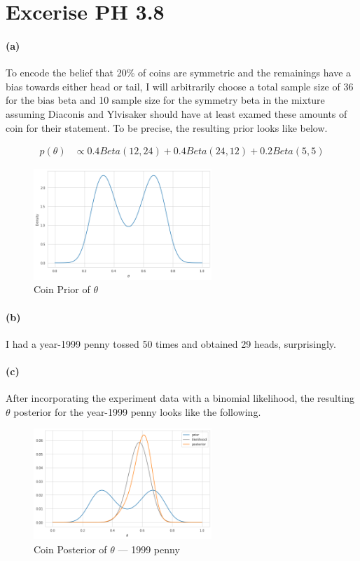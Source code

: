 \documentclass[11pt, letterpaper]{article}
\begin{document}
\section{Excerise PH 3.8}
\paragraph{(a)}
To encode the belief that 20\% of coins are symmetric and the remainings have a bias towards either head or tail, I
will arbitrarily choose a total sample size of 36 for the bias beta and 10 sample size for the symmetry beta
in the mixture assuming Diaconis and Ylvisaker should have at least examed these amounts of coin for their
statement. To be precise, the resulting prior looks like below.

\begin{align*}
  p(\theta) &\propto 0.4 Beta(12, 24) + 0.4 Beta(24, 12) + 0.2 Beta(5, 5)
\end{align*}
\begin{figure}[!h]
  \centering
  \includegraphics[width=0.6\textwidth]{3.8.a.png}
  \captionsetup{justification=centering}
  \caption{Coin Prior of $\theta$}
\end{figure}

\paragraph{(b)}
I had a year-1999 penny tossed 50 times and obtained 29 heads, surprisingly.

\paragraph{(c)}
After incorporating the experiment data with a binomial likelihood, the resulting $\theta$ posterior for the year-1999
penny looks like the following.

\begin{figure}[!h]
  \centering
  \includegraphics[width=0.6\textwidth]{3.8.c.png}
  \captionsetup{justification=centering}
  \caption{Coin Posterior of $\theta$ --- 1999 penny}
\end{figure}
\end{document}
